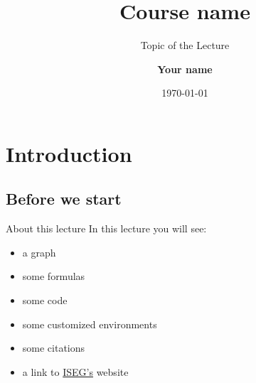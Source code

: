 


\title[Course name]{Course name}
\subtitle{Topic of the Lecture}

\author[Your name]{\textbf {Your name}}

\date{\today}








\section{Introduction}

\subsection{Before we start}

\begin{frame}{About this lecture}
	In this lecture you will see:
	\begin{itemize}
	\item a graph
	\item some formulas
	\item some code
	\item some customized environments
	\item some citations \citep{kass1995}
	\item a link to \href{https://www.iseg.ulisboa.pt/aquila/instituicao/ISEG/}{ISEG's} website
	\end{itemize}
\end{frame}


